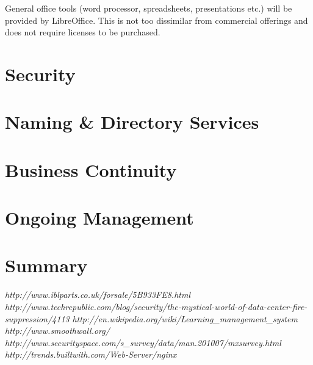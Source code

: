 \documentclass[a4paper, twoside]{article}
\begin{document}
General office tools (word processor, spreadsheets, presentations etc.) will be
provided by LibreOffice. This is not too dissimilar from commercial offerings
and does not require licenses to be purchased.

\section{Security}
\label{sec:security}

\section{Naming \& Directory Services}

\section{Business Continuity}

\section{Ongoing Management}

\section{Summary}

\begin{thebibliography}{1}

 {\em http://www.iblparts.co.uk/forsale/5B933FE8.html}
 {\em
  http://www.techrepublic.com/blog/security/the-mystical-world-of-data-center-fire-suppression/4113}
 {\em http://en.wikipedia.org/wiki/Learning\_management\_system}
 {\em http://www.smoothwall.org/}
 {\em http://www.securityspace.com/s\_survey/data/man.201007/mxsurvey.html}
 {\em http://trends.builtwith.com/Web-Server/nginx}

\end{thebibliography}
\end{document}
